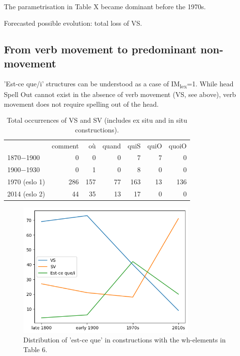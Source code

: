 \documentclass[fleqn,10pt]{wlscirep}
\begin{document}
\noindent The parametrisation in Table X became dominant before the 1970s.

\noindent Forecasted possible evolution: total loss of VS.

\subsection*{From verb movement to predominant non-movement}

'Est-ce que/i' structures can be understood as a case of IM\textsubscript{lex}=1. While head Spell Out cannot exist in the absence of verb movement (VS, see above), verb movement does not require spelling out of the head.

\begin{table}[H]
    \centering
    \large
        \begin{tabular}{|l|r|r|r|r|r|r|}
        \hline
        {} & comment & où & quand & quiS & quiO & quoiO \\
        1870$-$1900 & 0 & 0 & 0 & 7 & 7 & 0 \\
        1900$-$1930 & 0 & 1 & 0 & 8 & 0 & 0 \\
        1970 (eslo 1) & 286 & 157 & 77 & 163 & 13 & 136 \\
        2014 (eslo 2) & 44 & 35 & 13 & 17 & 0 & 0 \\
        \hline
        \end{tabular}
\caption{\label{tab:samp8}Total occurrences of VS and SV (includes ex situ and in situ constructions).}
\end{table}

\begin{figure}[H]
    \centering
    \includegraphics[width=90mm]{images/estceque.png} %
    \caption{Distribution of 'est-ce que' in constructions with the wh-elements in Table 6.}
    \label{fig:boat4}
  \end{figure}
\end{document}
